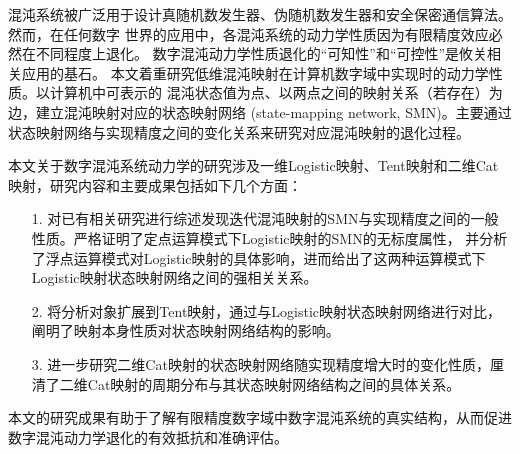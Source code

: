 ﻿%
\pagestyle{plain}
\begin{cnabstract}

混沌系统被广泛用于设计真随机数发生器、伪随机数发生器和安全保密通信算法。然而，在任何数字
世界的应用中，各混沌系统的动力学性质因为有限精度效应必然在不同程度上退化。
数字混沌动力学性质退化的“可知性”和“可控性”是攸关相关应用的基石。
本文着重研究低维混沌映射在计算机数字域中实现时的动力学性质。以计算机中可表示的
混沌状态值为点、以两点之间的映射关系（若存在）为边，建立混沌映射对应的状态映射网络
(state-mapping network, SMN)。主要通过状态映射网络与实现精度之间的变化关系来研究对应混沌映射的退化过程。

本文关于数字混沌系统动力学的研究涉及一维Logistic映射、Tent映射和二维Cat映射，研究内容和主要成果包括如下几个方面：
\begin{itemize}
\item[1.]
对已有相关研究进行综述发现迭代混沌映射的SMN与实现精度之间的一般性质。严格证明了定点运算模式下Logistic映射的SMN的无标度属性，
并分析了浮点运算模式对Logistic映射的具体影响，进而给出了这两种运算模式下Logistic映射状态映射网络之间的强相关关系。
\item[2.]
将分析对象扩展到Tent映射，通过与Logistic映射状态映射网络进行对比，阐明了映射本身性质对状态映射网络结构的影响。
\item[3.]
进一步研究二维Cat映射的状态映射网络随实现精度增大时的变化性质，厘清了二维Cat映射的周期分布与其状态映射网络结构之间的具体关系。
\end{itemize}

本文的研究成果有助于了解有限精度数字域中数字混沌系统的真实结构，从而促进数字混沌动力学退化的有效抵抗和准确评估。

\end{cnabstract}

